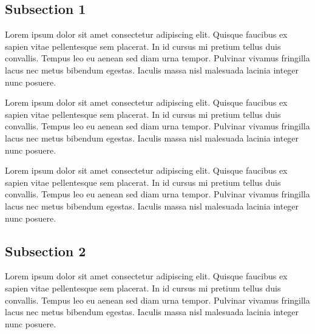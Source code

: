 \documentclass[sigconf,nonacm]{acmart} %
\begin{document}
\subsection{Subsection 1}
\label{subsec:subsection-1}

Lorem ipsum dolor sit amet consectetur adipiscing elit. 
Quisque faucibus ex sapien vitae pellentesque sem placerat.
In id cursus mi pretium tellus duis convallis. 
Tempus leo eu aenean sed diam urna tempor.
Pulvinar vivamus fringilla lacus nec metus bibendum egestas. 
Iaculis massa nisl malesuada lacinia integer nunc posuere.

Lorem ipsum dolor sit amet consectetur adipiscing elit.
Quisque faucibus ex sapien vitae pellentesque sem placerat. 
In id cursus mi pretium tellus duis convallis.
Tempus leo eu aenean sed diam urna tempor. 
Pulvinar vivamus fringilla lacus nec metus bibendum egestas.
Iaculis massa nisl malesuada lacinia integer nunc posuere. 

Lorem ipsum dolor sit amet consectetur adipiscing elit. 
Quisque faucibus ex sapien vitae pellentesque sem placerat.
In id cursus mi pretium tellus duis convallis. 
Tempus leo eu aenean sed diam urna tempor.
Pulvinar vivamus fringilla lacus nec metus bibendum egestas. 
Iaculis massa nisl malesuada lacinia integer nunc posuere.

\subsection{Subsection 2}
\label{subsec:subsection-2}

Lorem ipsum dolor sit amet consectetur adipiscing elit. 
Quisque faucibus ex sapien vitae pellentesque sem placerat.
In id cursus mi pretium tellus duis convallis. 
Tempus leo eu aenean sed diam urna tempor.
Pulvinar vivamus fringilla lacus nec metus bibendum egestas. 
Iaculis massa nisl malesuada lacinia integer nunc posuere.
\end{document}
